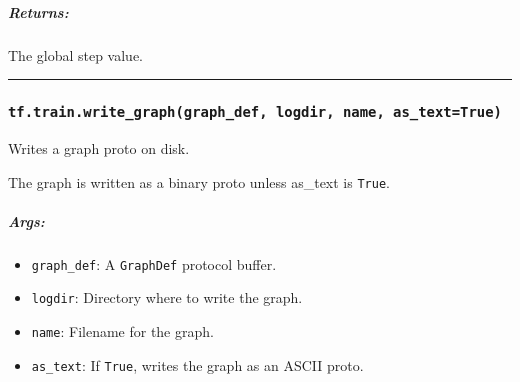 \subparagraph{Returns: }\label{returns-27}

The global step value.

\begin{center}\rule{0.5\linewidth}{\linethickness}\end{center}

\subsubsection{\texorpdfstring{\texttt{tf.train.write\_graph(graph\_def,\ logdir,\ name,\ as\_text=True)}
}{tf.train.write\_graph(graph\_def, logdir, name, as\_text=True) }}\label{tf.train.writeux5fgraphgraphux5fdef-logdir-name-asux5ftexttrue}

Writes a graph proto on disk.

The graph is written as a binary proto unless as\_text is \texttt{True}.

\begin{Shaded}
\begin{Highlighting}[]
\OperatorTok{=} \OperatorTok{=}\NormalTok{)}
\OperatorTok{=} 
\NormalTok{, }\NormalTok{)}
\end{Highlighting}
\end{Shaded}

\subparagraph{Args: }\label{args-42}

\begin{itemize}
\tightlist
\item
  \texttt{graph\_def}: A \texttt{GraphDef} protocol buffer.
\item
  \texttt{logdir}: Directory where to write the graph.
\item
  \texttt{name}: Filename for the graph.
\item
  \texttt{as\_text}: If \texttt{True}, writes the graph as an ASCII
  proto.
\end{itemize}
